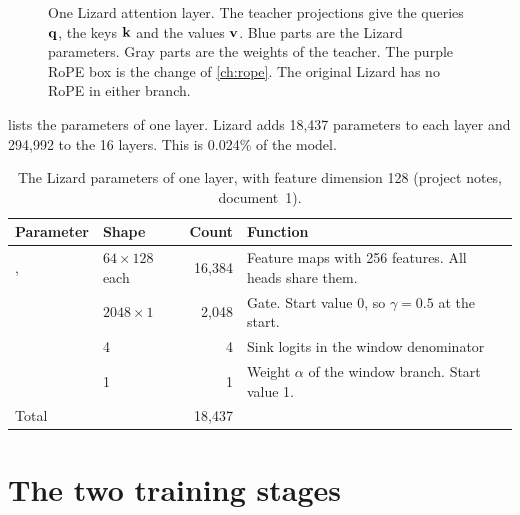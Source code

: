 \begin{figure}[t]
{%
}
\caption[One Lizard attention layer]{One Lizard attention layer. The teacher projections give the queries $\mathbf{q}$, the keys $\mathbf{k}$ and the values $\mathbf{v}$. Blue parts are the Lizard parameters. Gray parts are the weights of the teacher. The purple RoPE box is the change of \cref{ch:rope}. The original Lizard has no RoPE in either branch.}
\label{fig:lizard-layer}
\end{figure}

 lists the parameters of one layer. Lizard adds 18,437 parameters to each layer and 294,992 to the 16 layers. This is 0.024\% of the model.

\begin{table}[ht]
\centering
\small
\caption[The Lizard parameters of one layer]{The Lizard parameters of one layer, with feature dimension 128 (project notes, document~1).}
\label{tab:lizard-params}
\begin{tabularx}{\linewidth}{@{}llrL@{}}
\toprule
Parameter & Shape & Count & Function \\
\midrule
{},  & $64 \times 128$ each & 16,384 & Feature maps with 256 features. All heads share them. \\
 & $2048 \times 1$ & 2,048 & Gate. Start value 0, so $\gamma = 0.5$ at the start. \\
 & 4 & 4 & Sink logits in the window denominator \\
 & 1 & 1 & Weight $\alpha$ of the window branch. Start value 1. \\
\midrule
Total & & 18,437 & \\
\bottomrule
\end{tabularx}
\end{table}

\section{The two training stages}
\label{sec:stages}

